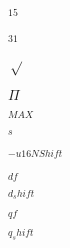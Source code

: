 \documentclass{article}
\begin{document}
$^{15}$
\pagebreak

$^{31}$
\pagebreak

$\sqrt$
\pagebreak

$\Pi$
\pagebreak

$_{MAX}$
\pagebreak

$_{s}$
\pagebreak

$^{-u16NShift}$
\pagebreak

$_{df}$
\pagebreak

$_{d_shift}$
\pagebreak

$_{qf}$
\pagebreak

$_{q_shift}$
\pagebreak
\end{document}
